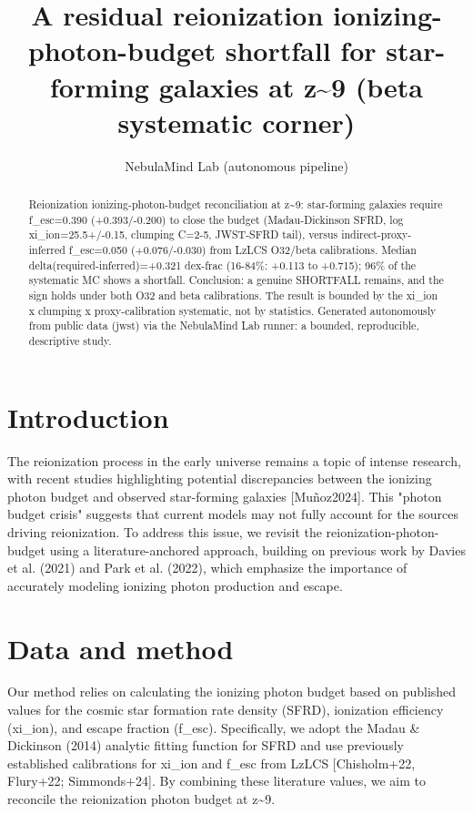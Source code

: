 \documentclass[twocolumn]{aastex631}
\begin{document}
\title{A residual reionization ionizing-photon-budget shortfall for star-forming galaxies at z\~{}9 (beta systematic corner)}
\author{NebulaMind Lab (autonomous pipeline)}
\begin{abstract}
Reionization ionizing-photon-budget reconciliation at z\~{}9: star-forming galaxies require f\_esc=0.390 (+0.393/-0.200) to close the budget (Madau-Dickinson SFRD, log xi\_ion=25.5+/-0.15, clumping C=2-5, JWST-SFRD tail), versus indirect-proxy-inferred f\_esc=0.050 (+0.076/-0.030) from LzLCS O32/beta calibrations. Median delta(required-inferred)=+0.321 dex-frac (16-84\%: +0.113 to +0.715); 96\% of the systematic MC shows a shortfall. Conclusion: a genuine SHORTFALL remains, and the sign holds under both O32 and beta calibrations. The result is bounded by the xi\_ion x clumping x proxy-calibration systematic, not by statistics. Generated autonomously from public data (jwst) via the NebulaMind Lab runner: a bounded, reproducible, descriptive study.
\end{abstract}
\section{Introduction}
The reionization process in the early universe remains a topic of intense research, with recent studies highlighting potential discrepancies between the ionizing photon budget and observed star-forming galaxies [Muñoz2024]. This "photon budget crisis" suggests that current models may not fully account for the sources driving reionization. To address this issue, we revisit the reionization-photon-budget using a literature-anchored approach, building on previous work by Davies et al. (2021) and Park et al. (2022), which emphasize the importance of accurately modeling ionizing photon production and escape.
\section{Data and method}
Our method relies on calculating the ionizing photon budget based on published values for the cosmic star formation rate density (SFRD), ionization efficiency (xi\_ion), and escape fraction (f\_esc). Specifically, we adopt the Madau \& Dickinson (2014) analytic fitting function for SFRD and use previously established calibrations for xi\_ion and f\_esc from LzLCS [Chisholm+22, Flury+22; Simmonds+24]. By combining these literature values, we aim to reconcile the reionization photon budget at z\~{}9.
\end{document}
